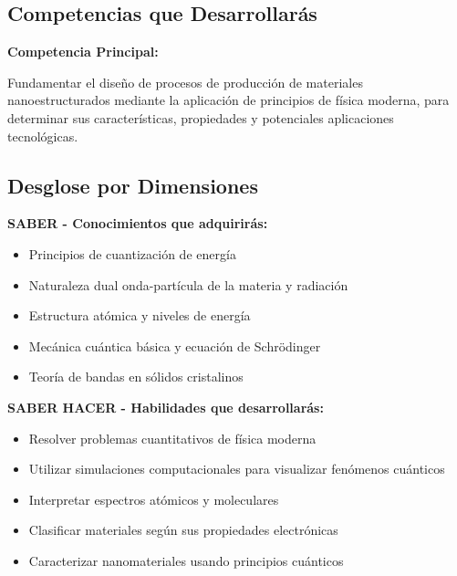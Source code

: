 \begin{tecnologiabox}
\begin{tecnologiabox}
\begin{tecnologiabox}
\begin{teknologiabox}
\begin{tecnologiabox}
\begin{tecnologiabox}
\begin{tecnologiabox}
\section{Competencias que Desarrollarás}

\begin{competenciabox}
\textbf{Competencia Principal:}

Fundamentar el diseño de procesos de producción de materiales nanoestructurados mediante la aplicación de principios de física moderna, para determinar sus características, propiedades y potenciales aplicaciones tecnológicas.
\end{competenciabox}

\subsection{Desglose por Dimensiones}

\begin{saberbox}
\textbf{SABER - Conocimientos que adquirirás:}
\begin{itemize}
	\item Principios de cuantización de energía
	\item Naturaleza dual onda-partícula de la materia y radiación
	\item Estructura atómica y niveles de energía
	\item Mecánica cuántica básica y ecuación de Schrödinger
	\item Teoría de bandas en sólidos cristalinos
\end{itemize}
\end{saberbox}

\begin{saberhacerbox}
\textbf{SABER HACER - Habilidades que desarrollarás:}
\begin{itemize}
	\item Resolver problemas cuantitativos de física moderna
	\item Utilizar simulaciones computacionales para visualizar fenómenos cuánticos
	\item Interpretar espectros atómicos y moleculares
	\item Clasificar materiales según sus propiedades electrónicas
	\item Caracterizar nanomateriales usando principios cuánticos
\end{itemize}
\end{saberhacerbox}


\end{tecnologiabox}
\end{tecnologiabox}
\end{tecnologiabox}
\end{teknologiabox}
\end{tecnologiabox}
\end{tecnologiabox}
\end{tecnologiabox}
